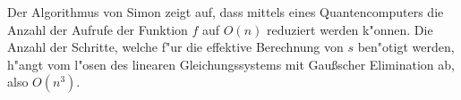 \begin{refsection}
Der Algorithmus von Simon zeigt auf, dass mittels eines Quantencomputers die
Anzahl der Aufrufe der Funktion $f$ auf $O(n)$ reduziert werden k"onnen. Die
Anzahl der Schritte, welche f"ur die effektive Berechnung von $s$ ben"otigt
werden, h"angt vom l"osen des linearen Gleichungssystems mit Gaußscher
Elimination ab, also $O(n^3)$.


\printbibliography[heading=subbibliography] \end{refsection}



